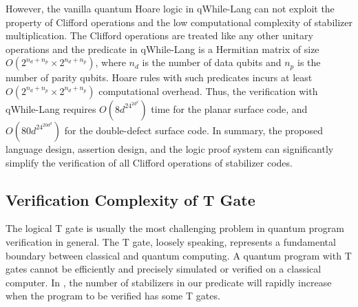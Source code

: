 However, 
the vanilla quantum Hoare logic in qWhile-Lang can not exploit the property of Clifford operations and the low computational complexity of stabilizer multiplication. 
The Clifford operations are treated like any other unitary operations and the predicate in qWhile-Lang is a Hermitian matrix
of size $O(2^{n_d + n_p}\times 2^{n_d + n_p})$, where $n_d$ is the number of data qubits and $n_p$ is the number of parity qubits. Hoare rules with such predicates incurs at least $O(2^{n_d + n_p}\times 2^{n_d + n_p})$ computational overhead. Thus, the verification with qWhile-Lang requires $O(8d^24^{2d^2})$ time for the planar surface code, and $O(80d^24^{20d^2})$ for the double-defect surface code.
In summary, the proposed language design, assertion design, and the logic proof system can significantly simplify the verification of all Clifford operations of stabilizer codes.


\begin{table}[]
\caption{
Comparison of {{\myFrameworkName}} and  qWhile-Lang on implementing and verifying surface codes. 
}
\label{tab:comp}
%
\end{table}





\subsection{Verification Complexity of T Gate}

The logical T gate is usually the most challenging problem in quantum program verification in general.
The T gate, loosely speaking, represents a fundamental boundary between classical and quantum computing. 
A quantum program with T gates cannot be efficiently and precisely simulated or verified on a classical computer. 
In \myFrameworkName, the number of stabilizers in our predicate will rapidly increase when the program to be verified has some T gates.


